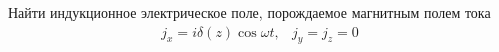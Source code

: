 \begin{tproblem}
  Найти индукционное электрическое поле, порождаемое магнитным полем тока
  \begin{equation*}
    \begin{array}{cc}
      j_x = iδ(z)\cos ωt, &j_y = j_z = 0
    \end{array}
  \end{equation*}
\end{tproblem}
